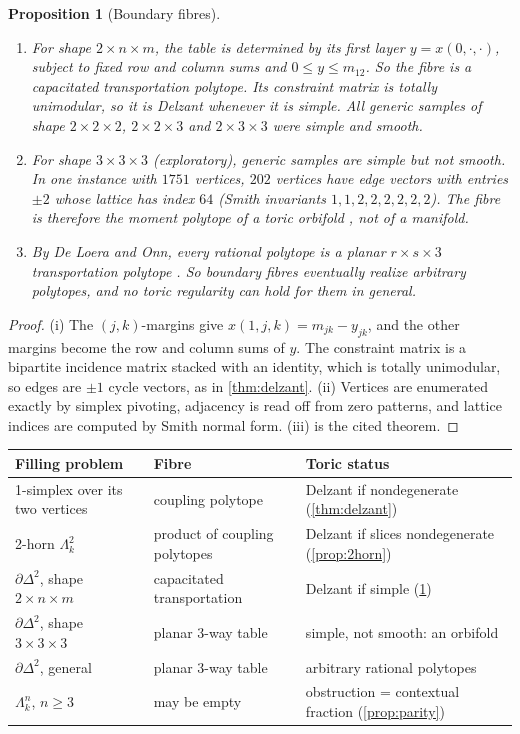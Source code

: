 \documentclass[11pt]{article}
\newtheorem{proposition}[theorem]{Proposition}
\theoremstyle{definition}
\theoremstyle{remark}
\begin{document}
\begin{proposition}[Boundary fibres]\label{prop:boundary}
\leavevmode
\begin{enumerate}[label=(\roman*)]
\item For shape $2\times n\times m$, the table is determined by its first layer $y=x(0,\cdot,\cdot)$, subject to fixed row and
  column sums and $0\le y\le m_{12}$. So the fibre is a capacitated transportation polytope. Its constraint matrix is
  totally unimodular, so it is Delzant whenever it is simple. All generic samples of shape $2\times2\times2$, $2\times2\times3$ and
  $2\times3\times3$ were simple and smooth.
\item For shape $3\times3\times3$ (exploratory), generic samples are simple but \emph{not} smooth. In one instance with $1751$
  vertices, $202$ vertices have edge vectors with entries $\pm2$ whose lattice has index $64$ (Smith invariants
  $1,1,2,2,2,2,2,2$). The fibre is therefore the moment polytope of a toric orbifold \cite{LermanTolman1997}, not of a
  manifold.
\item By De Loera and Onn, every rational polytope is a planar $r\times s\times3$ transportation polytope
  \cite{DeLoeraOnn2004}. So boundary fibres eventually realize arbitrary polytopes, and no toric regularity can
  hold for them in general.
\end{enumerate}
\end{proposition}
\begin{proof}
(i) The $(j,k)$-margins give $x(1,j,k)=m_{jk}-y_{jk}$, and the other margins become the row and column sums of $y$.
The constraint matrix is a bipartite incidence matrix stacked with an identity, which is totally unimodular,
so edges are $\pm1$ cycle vectors, as in \cref{thm:delzant}. (ii) Vertices are enumerated exactly by simplex
pivoting, adjacency is read off from zero patterns, and lattice indices are computed by Smith normal form.
(iii) is the cited theorem.
\end{proof}

\begin{center}\small
\begin{tabular}{@{}R{0.25\textwidth}R{0.3\textwidth}R{0.37\textwidth}@{}}
\toprule
Filling problem & Fibre & Toric status\\
-simplex over its two vertices & coupling polytope & Delzant if nondegenerate (\cref{thm:delzant})\\
2-horn $\Lambda^2_k$ & product of coupling polytopes & Delzant if slices nondegenerate (\cref{prop:2horn})\\
$\partial\Delta^2$, shape $2\times n\times m$ & capacitated transportation & Delzant if simple (\cref{prop:boundary})\\
$\partial\Delta^2$, shape $3\times3\times3$ & planar 3-way table & simple, not smooth: an orbifold\\
$\partial\Delta^2$, general & planar 3-way table & arbitrary rational polytopes \cite{DeLoeraOnn2004}\\
$\Lambda^n_k$, $n\ge3$ & may be empty & obstruction = contextual fraction (\cref{prop:parity})\\
\bottomrule
\end{tabular}
\end{center}
\end{document}

